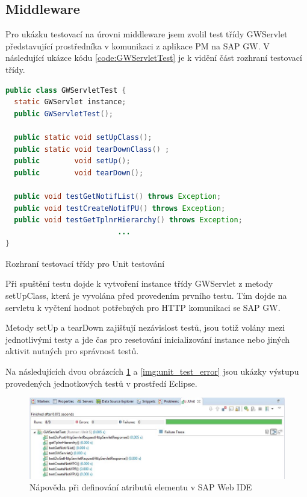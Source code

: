 \documentclass[thesis=M,czech]{FITthesis}[2012/06/26]
\begin{document}
\subsection{Middleware}
Pro ukázku testovací na úrovni middleware jsem zvolil test třídy GWServlet představující prostředníka v komunikaci z aplikace PM na SAP GW.  V následující ukázce kódu \ref{code:GWServletTest} je k vidění část rozhraní testovací třídy. 
\begin{algorithm}[H]
	\begin{lstlisting}[language=java]   
public class GWServletTest {
  static GWServlet instance;	
  public GWServletTest();
	
  public static void setUpClass();
  public static void tearDownClass() ;
  public        void setUp();
  public        void tearDown();
	
  public void testGetNotifList() throws Exception;
  public void testCreateNotifPU() throws Exception;
  public void testGetTplnrHierarchy() throws Exception;
                          ...
}
	\end{lstlisting}
	\caption{Rozhraní testovací třídy pro Unit testování}	
	\label{code:GWServletTest}
\end{algorithm}

Při spuštění testu dojde k vytvoření instance třídy GWServlet z metody setUpClass, která je vyvolána před provedením prvního testu. Tím dojde na servletu k vyčtení hodnot potřebných pro HTTP komunikaci se SAP GW.

Metody setUp a tearDown zajišťují nezávislost testů, jsou totiž volány mezi jednotlivými testy a jde čas pro resetování inicializování instance nebo jiných aktivit nutných pro správnost testů. 

Na následujících dvou obrázcích \ref{img:unit_test_success} a \ref{img:unit_test_error} jsou ukázky výstupu provedených jednotkových testů v prostředí Eclipse.	

\begin{figure}[H]
	\centering
	\includegraphics[width=1\textwidth]{images/unit_test_success}
	\caption{Nápověda při definování atributů elementu v SAP Web IDE}
	\label{img:unit_test_success}
\end{figure}
\end{document}
